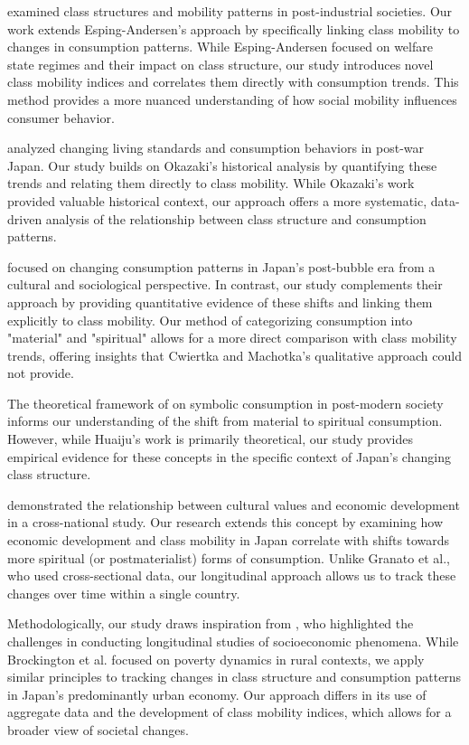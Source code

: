 \documentclass{article} %
\begin{document}
\citet{Esping-Andersen1993ChangingC} examined class structures and mobility patterns in post-industrial societies. Our work extends Esping-Andersen's approach by specifically linking class mobility to changes in consumption patterns. While Esping-Andersen focused on welfare state regimes and their impact on class structure, our study introduces novel class mobility indices and correlates them directly with consumption trends. This method provides a more nuanced understanding of how social mobility influences consumer behavior.

\citet{Okazaki2017HistoryOT} analyzed changing living standards and consumption behaviors in post-war Japan. Our study builds on Okazaki's historical analysis by quantifying these trends and relating them directly to class mobility. While Okazaki's work provided valuable historical context, our approach offers a more systematic, data-driven analysis of the relationship between class structure and consumption patterns.

\citet{Cwiertka2018ConsumingLI} focused on changing consumption patterns in Japan's post-bubble era from a cultural and sociological perspective. In contrast, our study complements their approach by providing quantitative evidence of these shifts and linking them explicitly to class mobility. Our method of categorizing consumption into "material" and "spiritual" allows for a more direct comparison with class mobility trends, offering insights that Cwiertka and Machotka's qualitative approach could not provide.

The theoretical framework of \citet{Huaiju2014EthicalIO} on symbolic consumption in post-modern society informs our understanding of the shift from material to spiritual consumption. However, while Huaiju's work is primarily theoretical, our study provides empirical evidence for these concepts in the specific context of Japan's changing class structure.

\citet{Granato1996TheEO} demonstrated the relationship between cultural values and economic development in a cross-national study. Our research extends this concept by examining how economic development and class mobility in Japan correlate with shifts towards more spiritual (or postmaterialist) forms of consumption. Unlike Granato et al., who used cross-sectional data, our longitudinal approach allows us to track these changes over time within a single country.

Methodologically, our study draws inspiration from \citet{Brockington2019AssetsAD}, who highlighted the challenges in conducting longitudinal studies of socioeconomic phenomena. While Brockington et al. focused on poverty dynamics in rural contexts, we apply similar principles to tracking changes in class structure and consumption patterns in Japan's predominantly urban economy. Our approach differs in its use of aggregate data and the development of class mobility indices, which allows for a broader view of societal changes.
\end{document}
